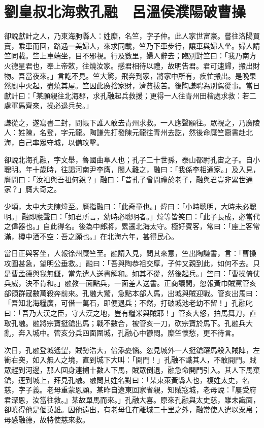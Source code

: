 
\chapter{劉皇叔北海救孔融　呂溫侯濮陽破曹操}

卻說獻計之人，乃東海朐縣人：姓糜，名竺，字子仲。此人家世富豪。嘗往洛陽買賣，乘車而回，路遇一美婦人，來求同載，竺乃下車步行，讓車與婦人坐。婦人請竺同載。竺上車端坐，目不邪視。行及數里，婦人辭去；臨別對竺曰：「我乃南方火德星君也，奉上帝敕，往燒汝家。感君相待以禮，故明告君。君可速歸，搬出財物。吾當夜來。」言訖不見。竺大驚，飛奔到家，將家中所有，疾忙搬出。是晚果然廚中火起，盡燒其屋。竺因此廣捨家財，濟貧拔苦。後陶謙聘為別駕從事。當日獻計曰：「某願親往北海郡，求孔融起兵救援；更得一人往青州田楷處求救：若二處軍馬齊來，操必退兵矣。」

謙從之，遂寫書二封，問帳下誰人敢去青州求救。一人應聲願往。眾視之，乃廣陵人：姓陳，名登，字元龍。陶謙先打發陳元龍往青州去訖，然後命糜竺齎書赴北海，自己率眾守城，以備攻擊。

卻說北海孔融，字文舉，魯國曲阜人也；孔子二十世孫，泰山都尉孔宙之子。自小聰明。年十歲時，往謁河南尹李膺，閽人難之，融曰：「我係李相通家。」及入見，膺問曰：「汝祖與吾祖何親？」融曰：「昔孔子曾問禮於老子，融與君豈非累世通家？」膺大奇之。

少頃，太中大夫陳煒至。膺指融曰：「此奇童也。」煒曰：「小時聰明，大時未必聰明。」融即應聲曰：「如君所言，幼時必聰明者。」煒等皆笑曰：「此子長成，必當代之偉器也。」自此得名。後為中郎將，累遷北海太守。極好賓客，常曰：「座上客常滿，樽中酒不空：吾之願也。」在北海六年，甚得民心。

當日正與客坐，人報徐州糜竺至。融請入見，問其來意，竺出陶謙書，言：「曹操攻圍甚急，望明公垂救。」融曰：「吾與陶恭祖交厚，子仲又親到此，如何不去。只是曹孟德與我無讎，當先遣人送書解和。如其不從，然後起兵。」竺曰：「曹操倚仗兵威，決不肯和。」融教一面點兵，一面差人送書。正商議間，忽報黃巾賊黨管亥部領群寇數萬殺奔前來。孔融大驚，急點本部人馬，出城與賊迎戰。管亥出馬曰：「吾知北海糧廣，可借一萬石，即便退兵；不然，打破城池老幼不留！」孔融叱曰：「吾乃大漢之臣，守大漢之地，豈有糧米與賊耶！」管亥大怒，拍馬舞刀，直取孔融。融將宗寶挺鎗出馬；戰不數合，被管亥一刀，砍宗寶於馬下。孔融兵大亂，奔入城中。管亥分兵四面圍城，孔融心中鬱悶。糜竺懷愁，更不待言。

次日，孔融登城遙望，賊勢浩大，倍添憂惱。忽見城外一人挺鎗躍馬殺入賊陣，左衝右突，如入無人之境，直到城下大叫：「開門！」孔融不識其人，不敢開門。賊眾趕到河邊，那人回身連搠十數人下馬，賊眾倒退，融急命開門引入。其人下馬棄鎗，逕到城上，拜見孔融。融問其姓名對曰：「某東萊黃縣人也，複姓太史，名慈，字子義。老母重蒙恩顧。某昨自遼東回家省親，知賊寇城，老母說：『屢受府君深恩，汝當往救。』某故單馬而來。」孔融大喜。原來孔融與太史慈，雖未識面，卻曉得他是個英雄。因他遠出，有老母住在離城二十里之外，融常使人遣以粟帛；母感融德，故特使慈來救。

